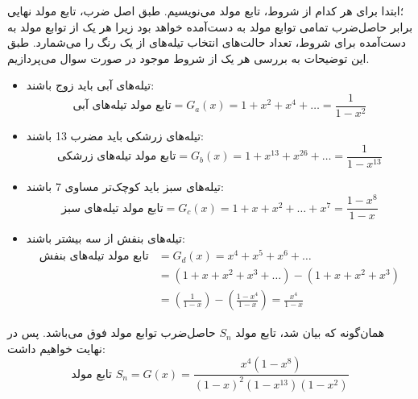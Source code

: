 \p
 ؛ابتدا برای هر کدام از شروط، تابع مولد می‌نویسیم. طبق اصل ضرب، تابع مولد نهایی برابر حاصل‌ضرب تمامی  توابع مولد به دست‌آمده خواهد بود
    زیرا هر یک از توابع مولد به دست‌آمده برای شروط، تعداد حالت‌های انتخاب‌ تیله‌های از یک رنگ را می‌شمارد.  
   طبق این توضیحات به بررسی هر یک از شروط موجود در صورت سوال می‌پردازیم.
\begin{itemize}
    \item 
    تیله‌های آبی باید زوج باشند:
    $$\text{تابع مولد تیله‌های آبی} = G_a(x) = 1 + x^2 + x^4 + \ldots = \frac{1}{1-x^2}$$
    \item
    تیله‌های زرشکی باید مضرب 13 باشند:
    $$\text{تابع مولد تیله‌های زرشکی} = G_b(x) = 1 + x^{13} + x^{26} + \ldots = \frac{1}{1-x^{13}}$$
    \item
    تیله‌های سبز باید کوچک‌تر مساوی 7 باشند:
    $$\text{تابع مولد تیله‌های سبز} = G_c(x) = 1 + x + x^2 + \ldots + x^7 = \frac{1-x^8}{1-x}$$
    \item
    تیله‌های بنفش از سه بیشتر باشند:
    \begin{align*}
    \text{تابع مولد تیله‌های بنفش} &= G_d(x) = x^4 + x^5 + x^6 + \ldots\\
    &= (1+x+x^2+x^3+\ldots) - (1 + x + x^2 + x^3)\\
    &= (\frac{1}{1-x}) - (\frac{1-x^4}{1-x}) = \frac{x^4}{1-x}
    \end{align*}
\end{itemize}
\p
  همان‌گونه که بیان شد، تابع مولد
$S_n$
حاصل‌ضرب توابع مولد فوق می‌باشد. پس در نهایت خواهیم داشت:
$$\text{تابع مولد $S_n$} = G(x) = \frac{x^4(1-x^8)}{(1-x)^2(1-x^{13})(1-x^{2})}$$